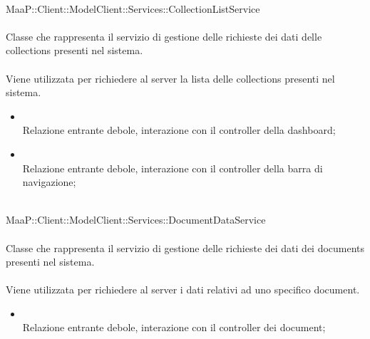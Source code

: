 \\
MaaP::Client::ModelClient::Services::CollectionListService\\
\\
Classe che rappresenta il servizio di gestione delle richieste dei dati delle collections presenti nel sistema.\\
\\
Viene utilizzata per richiedere al server la lista delle collections presenti nel sistema.\\
\begin{itemize}
\item{}\\
Relazione entrante debole, interazione con il controller della dashboard;
\item{}\\
Relazione entrante debole, interazione con il controller della barra di navigazione;
\end{itemize}

\\
MaaP::Client::ModelClient::Services::DocumentDataService\\
\\
Classe che rappresenta il servizio di gestione delle richieste dei dati dei documents presenti nel sistema.\\
\\
Viene utilizzata per richiedere al server i dati relativi ad uno specifico document.\\
\begin{itemize}
\item{}\\
Relazione entrante debole, interazione con il controller dei document;
\end{itemize}


